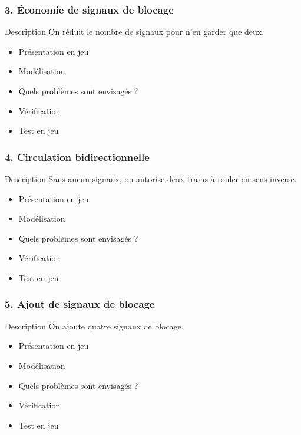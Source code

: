 \documentclass[french]{beamer}
\begin{document}
\begin{frame}
  \frametitle{3. Économie de signaux de blocage}
  \begin{block}{Description}
  On réduit le nombre de signaux pour n'en garder que deux.
  \end{block}

  \begin{itemize}
  \item Présentation en jeu
  \item Modélisation
  \item Quels problèmes sont envisagés ?
  \item Vérification
  \item Test en jeu
  \end{itemize}
\end{frame}

\begin{frame}
  \frametitle{4. Circulation bidirectionnelle}
  \begin{block}{Description}
  Sans aucun signaux, on autorise deux trains à rouler en sens inverse.
  \end{block}

  \begin{itemize}
  \item Présentation en jeu
  \item Modélisation
  \item Quels problèmes sont envisagés ?
  \item Vérification
  \item Test en jeu
  \end{itemize}
\end{frame}

\begin{frame}
  \frametitle{5. Ajout de signaux de blocage}
  \begin{block}{Description}
  On ajoute quatre signaux de blocage.
  \end{block}

  \begin{itemize}
  \item Présentation en jeu
  \item Modélisation
  \item Quels problèmes sont envisagés ?
  \item Vérification
  \item Test en jeu
  \end{itemize}
\end{frame}
\end{document}
